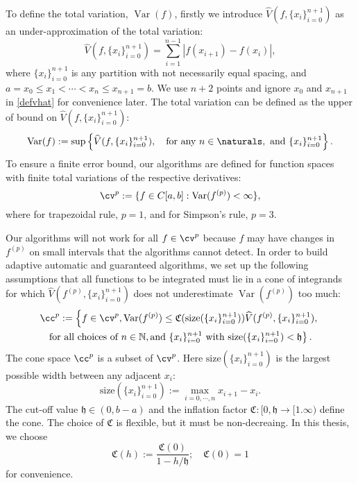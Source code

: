 \documentclass[draft]{iitthesis}
\DeclareMathOperator{\Var}{Var}
\theoremstyle{definition}
\theoremstyle{remark}
\begin{document}
To define the total variation, $\Var(f)$, firstly we introduce $\widehat{V}(f,\{x_i\}_{i=0}^{n+1})$ as an under-approximation of the total variation:
\begin{equation}\label{defvhat}
    \widehat{V}(f,\{x_i\}_{i=0}^{n+1})=\sum_{i=1}^{n-1}|f(x_{i+1})-f(x_{i})|,
\end{equation}
where $\{x_i\}_{i=0}^{n+1}$ is any partition with not necessarily equal spacing, and $a=x_{0}\leq x_{1}<\cdots<x_{n}\leq x_{n+1}=b$.
We use $n+2$ points and ignore $x_0$ and $x_{n+1}$ in \eqref{defvhat} for convenience later.
The total variation can be defined as the upper of bound on $\widehat{V}(f,\{x_i\}_{i=0}^{n+1})$:
\begin{equation}\label{defvar}
  \Var(f) := \sup \left\{\widehat{V}(f,\{x_i\}_{i=0}^{n+1}), \quad \text{for any }n \in \naturals, \text{ and } \{x_i\}_{i=0}^{n+1}\right\}.
\end{equation}
To ensure a finite error bound, our algorithms are defined for function spaces with finite total variations of the respective derivatives:
\begin{equation}\label{defspace}
 \cv^{p}:=\{f\in C[a,b]: \Var(f^{(p)}) < \infty \},
\end{equation}
where for trapezoidal rule, $p=1$, and for Simpson's rule, $p=3$.

Our algorithms will not work for all $f \in \cv^{p}$ because $f$ may have changes in $f^{(p)}$ on small intervals that the algorithms cannot detect. In order to build adaptive automatic and guaranteed algorithms, we set up the following assumptions that all functions to be integrated must lie in a cone of integrands for which $\widehat{V}(f^{(p)},\{x_i\}_{i=0}^{n+1})$ does not underestimate $\Var(f^{(p)})$ too much:
\begin{multline}\label{defcone}
\cc^{p}:=\left\{f\in \cv^{p}, \Var(f^{(p)})\leq \mathfrak{C}(\text{size}(\{x_i\}_{i=0}^{n+1}))\widehat{V}(f^{(p)},\{x_i\}_{i=0}^{n+1}),\right.\\ \left.\text{for all choices of } n\in \mathbb{N}, \text{and }\{x_i\}_{i=0}^{n+1} \text{ with }\text{size}(\{x_i\}_{i=0}^{n+1})<\mathfrak{h}\right\}.
\end{multline}
The cone space $\cc^{p}$ is a subset of $\cv^{p}$. Here $\text{size}(\{x_i\}_{i=0}^{n+1})$ is the largest possible width between any adjacent $x_i$:
\begin{equation}\label{defsize}
  \text{size}(\{x_i\}_{i=0}^{n+1}):=\max_{i=0,\cdots, n} x_{i+1}-x_{i}.
\end{equation}
The cut-off value $\mathfrak{h} \in (0, b-a)$ and the inflation factor $\mathfrak{C}: [0,\mathfrak{h} \rightarrow [1.\infty)$ define the cone. The choice of $\mathfrak{C}$ is flexible, but it must be non-decreaing. In this thesis, we choose
\begin{equation}\label{definflationfactor}
  \mathfrak{C}(h):=\frac{\mathfrak{C}(0)}{1-h/\mathfrak{h}}; \quad \mathfrak{C}(0)=1
\end{equation}
for convenience.
\end{document}
